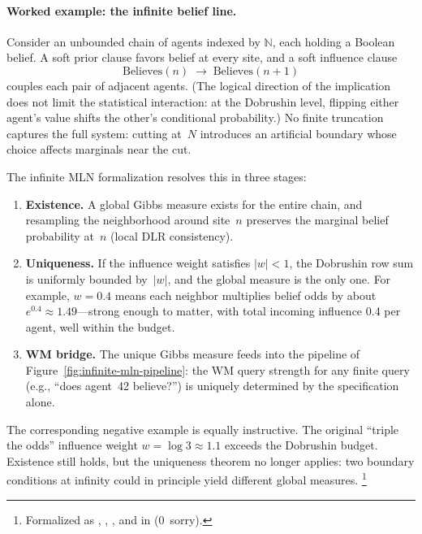 \documentclass[11pt,openany]{report}
\begin{document}
\paragraph{Worked example: the infinite belief line.}
Consider an unbounded chain of agents indexed by $\mathbb{N}$, each holding a
Boolean belief.  A soft prior clause favors belief at every site, and a soft
influence clause
\[
  \mathrm{Believes}(n) \;\to\; \mathrm{Believes}(n{+}1)
\]
couples each pair of adjacent agents.  (The logical direction of the implication
does not limit the statistical interaction: at the Dobrushin level, flipping
either agent's value shifts the other's conditional probability.)  No finite
truncation captures the full system: cutting at~$N$ introduces an artificial
boundary whose choice affects marginals near the cut.

The infinite MLN formalization resolves this in three stages:
\begin{enumerate}
\item \textbf{Existence.}  A global Gibbs measure exists for the entire chain,
  and resampling the neighborhood around site~$n$ preserves the marginal belief
  probability at~$n$ (local DLR consistency).
\item \textbf{Uniqueness.}  If the influence weight satisfies $|w| < 1$, the
  Dobrushin row sum is uniformly bounded by~$|w|$, and the global measure is
  the only one.  For example, $w = 0.4$ means each neighbor multiplies belief
  odds by about $e^{0.4} \approx 1.49$---strong enough to matter, with total
  incoming influence 0.4 per agent, well within the budget.
\item \textbf{WM bridge.}  The unique Gibbs measure feeds into the pipeline of
  Figure~\ref{fig:infinite-mln-pipeline}: the WM query strength for any finite
  query (e.g., ``does agent~42 believe?'') is uniquely determined by the
  specification alone.
\end{enumerate}
\noindent
The corresponding negative example is equally instructive.  The original
``triple the odds'' influence weight $w = \log 3 \approx 1.1$ exceeds the
Dobrushin budget.  Existence still holds, but the uniqueness theorem no longer
applies: two boundary conditions at infinity could in principle yield different
global measures.%
\footnote{Formalized as
,
,
, and
 in
(0~sorry).}
\end{document}
